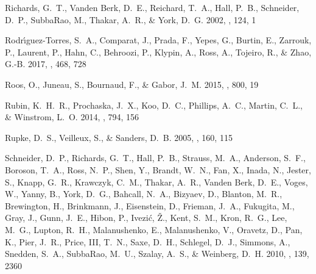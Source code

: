 \documentclass[iop]{emulateapj}
\begin{document}
\begin{thebibliography}{45}
{Richards}, G.~T., {Vanden Berk}, D.~E., {Reichard}, T.~A., {Hall}, P.~B.,
  {Schneider}, D.~P., {SubbaRao}, M., {Thakar}, A.~R., \& {York}, D.~G. 2002,
  \aj, 124, 1

{Rodr{\'{\i}}guez-Torres}, S.~A., {Comparat}, J., {Prada}, F., {Yepes}, G.,
  {Burtin}, E., {Zarrouk}, P., {Laurent}, P., {Hahn}, C., {Behroozi}, P.,
  {Klypin}, A., {Ross}, A., {Tojeiro}, R., \& {Zhao}, G.-B. 2017, \mnras, 468,
  728

{Roos}, O., {Juneau}, S., {Bournaud}, F., \& {Gabor}, J.~M. 2015, \apj, 800, 19

{Rubin}, K.~H.~R., {Prochaska}, J.~X., {Koo}, D.~C., {Phillips}, A.~C.,
  {Martin}, C.~L., \& {Winstrom}, L.~O. 2014, \apj, 794, 156

{Rupke}, D.~S., {Veilleux}, S., \& {Sanders}, D.~B. 2005, \apjs, 160, 115

{Schneider}, D.~P., {Richards}, G.~T., {Hall}, P.~B., {Strauss}, M.~A.,
  {Anderson}, S.~F., {Boroson}, T.~A., {Ross}, N.~P., {Shen}, Y., {Brandt},
  W.~N., {Fan}, X., {Inada}, N., {Jester}, S., {Knapp}, G.~R., {Krawczyk},
  C.~M., {Thakar}, A.~R., {Vanden Berk}, D.~E., {Voges}, W., {Yanny}, B.,
  {York}, D.~G., {Bahcall}, N.~A., {Bizyaev}, D., {Blanton}, M.~R.,
  {Brewington}, H., {Brinkmann}, J., {Eisenstein}, D., {Frieman}, J.~A.,
  {Fukugita}, M., {Gray}, J., {Gunn}, J.~E., {Hibon}, P., {Ivezi{\'c}}, {\v
  Z}., {Kent}, S.~M., {Kron}, R.~G., {Lee}, M.~G., {Lupton}, R.~H.,
  {Malanushenko}, E., {Malanushenko}, V., {Oravetz}, D., {Pan}, K., {Pier},
  J.~R., {Price}, III, T.~N., {Saxe}, D.~H., {Schlegel}, D.~J., {Simmons}, A.,
  {Snedden}, S.~A., {SubbaRao}, M.~U., {Szalay}, A.~S., \& {Weinberg}, D.~H.
  2010, \aj, 139, 2360


\end{thebibliography}
\end{document}
